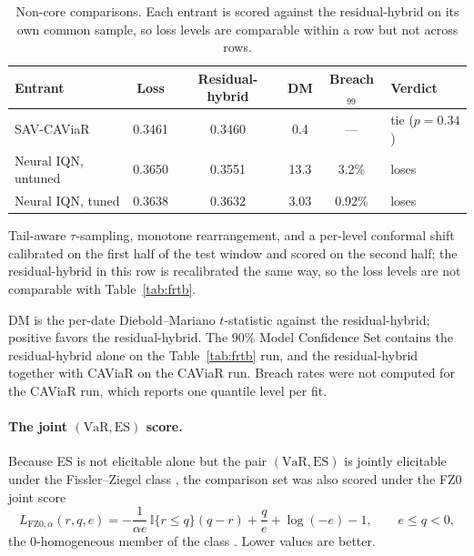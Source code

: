 \documentclass[11pt]{article}
\newcommand{\VaR}{\mathrm{VaR}}
\newcommand{\ES}{\mathrm{ES}}
\theoremstyle{remark}
\begin{document}
\begin{table}[htbp]
\centering
\begin{threeparttable}
\caption{Non-core comparisons. Each entrant is scored against the residual-hybrid on its own common sample, so loss levels are comparable within a row but not across rows.}
\label{tab:noncore}
\footnotesize\setlength{\tabcolsep}{5pt}
\begin{tabular}{lccccl}
\toprule
Entrant & Loss & Residual-hybrid & DM & Breach$_{99}$ & Verdict \\
\midrule
SAV-CAViaR & 0.3461 & 0.3460 & 0.4 & --- & tie ($p=0.34$) \\
Neural IQN, untuned & 0.3650 & 0.3551 & 13.3 & 3.2\% & loses \\
Neural IQN, tuned\tnote{a} & 0.3638 & 0.3632 & 3.03 & 0.92\% & loses \\
\bottomrule
\end{tabular}
\begin{tablenotes}[flushleft]\footnotesize
\item[a] Tail-aware $\tau$-sampling, monotone rearrangement, and a per-level conformal shift calibrated on the first half of the test window and scored on the second half; the residual-hybrid in this row is recalibrated the same way, so the loss levels are not comparable with Table~\ref{tab:frtb}.
\item DM is the per-date Diebold--Mariano $t$-statistic against the residual-hybrid; positive favors the residual-hybrid. The $90\%$ Model Confidence Set contains the residual-hybrid alone on the Table~\ref{tab:frtb} run, and the residual-hybrid together with CAViaR on the CAViaR run. Breach rates were not computed for the CAViaR run, which reports one quantile level per fit.
\end{tablenotes}
\end{threeparttable}
\end{table}


\paragraph{The joint $(\VaR,\ES)$ score.} Because ES is not elicitable
alone but the pair $(\VaR,\ES)$ is jointly elicitable under the
Fissler--Ziegel class \citep{fissler2016}, the comparison set was also scored under the FZ0 joint score
\begin{equation}
L_{\mathrm{FZ0},\alpha}(r,q,e)=-\frac{1}{\alpha e}\,\mathbb{I}\{r\le q\}(q-r)
+\frac{q}{e}+\log(-e)-1,\qquad e\le q<0,
\label{eq:fz0}
\end{equation}
the $0$-homogeneous member of the class \citep{patton2019}. Lower values are better. 
\end{document}

